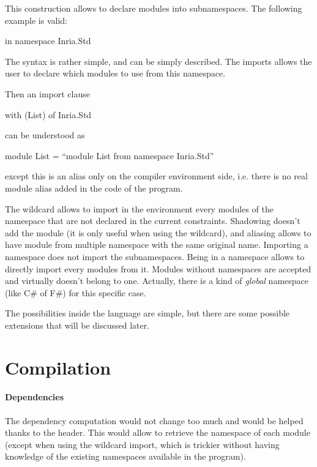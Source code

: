 This construction allows to declare modules into subnamespaces. The following
example is valid:

\begin{OCaml}
in namespace Inria.Std
\end{OCaml}

The syntax is rather simple, and can be simply described. The imports allows the
user to declare which modules to use from this namespace. 

Then an import clause
\begin{OCaml}
with (List) of Inria.Std
\end{OCaml}
can be understood as
\begin{OCaml}
module List = ``module List from namespace Inria.Std''
\end{OCaml}
except this is an alias only on the compiler environment side, i.e. there is no
real module alias added in the code of the program.

The wildcard allows to import in the environment every modules of the namespace
that are not declared in the current constraints. Shadowing doesn't add the
module (it is only useful when using the wildcard), and aliasing allows to have
module from multiple namespace with the same original name. Importing a
namespace does not import the subnamespaces. Being in a namespace allows to
directly import every modules from it. Modules without namespaces are accepted
and virtually doesn't belong to one. Actually, there is a kind of \emph{global}
namespace (like C\# of F\#) for this specific case.

The possibilities inside the language are simple, but there are some possible
extensions that will be discussed later.

\section{Compilation}

\paragraph{Dependencies}

The dependency computation would not change too much and would be helped thanks
to the header. This would allow to retrieve the namespace of each module (except
when using the wildcard import, which is trickier without having knowledge of
the existing namespaces available in the program).

